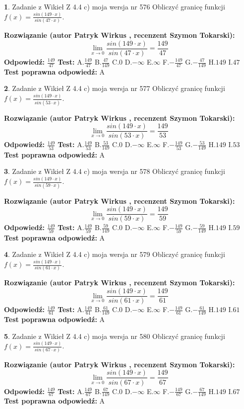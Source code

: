 \documentclass[12pt, a4paper]{article}
\theoremstyle{definition} %
\newtheorem{zad}{}
\newcommand{\zadStart}[1]{\begin{zad}#1\newline}
\newcommand{\zadStop}{\end{zad}}
\newcommand{\rozwStart}[2]{\noindent \textbf{Rozwiązanie (autor #1 , recenzent #2): }\newline}
\newcommand{\rozwStop}{\newline}
\newcommand{\odpStart}{\noindent \textbf{Odpowiedź:}\newline}
\newcommand{\odpStop}{\newline}
\newcommand{\testStart}{\noindent \textbf{Test:}\newline}
\newcommand{\testStop}{\newline}
\newcommand{\kluczStart}{\noindent \textbf{Test poprawna odpowiedź:}\newline}
\newcommand{\kluczStop}{\newline}
\begin{document}
\zadStart{Zadanie z Wikieł Z 4.4 c) moja wersja nr 576}
Obliczyć granicę funkcji $f(x)=\frac{sin(149\cdot x)}{sin(47\cdot x)}$.
\zadStop
\rozwStart{Patryk Wirkus}{Szymon Tokarski}
$$\lim\limits_{x\to 0}\frac{sin(149\cdot x)}{sin(47\cdot x)}=
\frac{149}{47}$$
\rozwStop
\odpStart
$\frac{149}{47}$
\odpStop
\testStart
A.$\frac{149}{47}$
B.$\frac{47}{149}$
C.$0$
D.$-\infty$
E.$\infty$
F.$-\frac{149}{47}$
G.$-\frac{47}{149}$
H.$149$
I.$47$
\testStop
\kluczStart
A
\kluczStop



\zadStart{Zadanie z Wikieł Z 4.4 c) moja wersja nr 577}
Obliczyć granicę funkcji $f(x)=\frac{sin(149\cdot x)}{sin(53\cdot x)}$.
\zadStop
\rozwStart{Patryk Wirkus}{Szymon Tokarski}
$$\lim\limits_{x\to 0}\frac{sin(149\cdot x)}{sin(53\cdot x)}=
\frac{149}{53}$$
\rozwStop
\odpStart
$\frac{149}{53}$
\odpStop
\testStart
A.$\frac{149}{53}$
B.$\frac{53}{149}$
C.$0$
D.$-\infty$
E.$\infty$
F.$-\frac{149}{53}$
G.$-\frac{53}{149}$
H.$149$
I.$53$
\testStop
\kluczStart
A
\kluczStop



\zadStart{Zadanie z Wikieł Z 4.4 c) moja wersja nr 578}
Obliczyć granicę funkcji $f(x)=\frac{sin(149\cdot x)}{sin(59\cdot x)}$.
\zadStop
\rozwStart{Patryk Wirkus}{Szymon Tokarski}
$$\lim\limits_{x\to 0}\frac{sin(149\cdot x)}{sin(59\cdot x)}=
\frac{149}{59}$$
\rozwStop
\odpStart
$\frac{149}{59}$
\odpStop
\testStart
A.$\frac{149}{59}$
B.$\frac{59}{149}$
C.$0$
D.$-\infty$
E.$\infty$
F.$-\frac{149}{59}$
G.$-\frac{59}{149}$
H.$149$
I.$59$
\testStop
\kluczStart
A
\kluczStop



\zadStart{Zadanie z Wikieł Z 4.4 c) moja wersja nr 579}
Obliczyć granicę funkcji $f(x)=\frac{sin(149\cdot x)}{sin(61\cdot x)}$.
\zadStop
\rozwStart{Patryk Wirkus}{Szymon Tokarski}
$$\lim\limits_{x\to 0}\frac{sin(149\cdot x)}{sin(61\cdot x)}=
\frac{149}{61}$$
\rozwStop
\odpStart
$\frac{149}{61}$
\odpStop
\testStart
A.$\frac{149}{61}$
B.$\frac{61}{149}$
C.$0$
D.$-\infty$
E.$\infty$
F.$-\frac{149}{61}$
G.$-\frac{61}{149}$
H.$149$
I.$61$
\testStop
\kluczStart
A
\kluczStop



\zadStart{Zadanie z Wikieł Z 4.4 c) moja wersja nr 580}
Obliczyć granicę funkcji $f(x)=\frac{sin(149\cdot x)}{sin(67\cdot x)}$.
\zadStop
\rozwStart{Patryk Wirkus}{Szymon Tokarski}
$$\lim\limits_{x\to 0}\frac{sin(149\cdot x)}{sin(67\cdot x)}=
\frac{149}{67}$$
\rozwStop
\odpStart
$\frac{149}{67}$
\odpStop
\testStart
A.$\frac{149}{67}$
B.$\frac{67}{149}$
C.$0$
D.$-\infty$
E.$\infty$
F.$-\frac{149}{67}$
G.$-\frac{67}{149}$
H.$149$
I.$67$
\testStop
\kluczStart
A
\kluczStop
\end{document}
